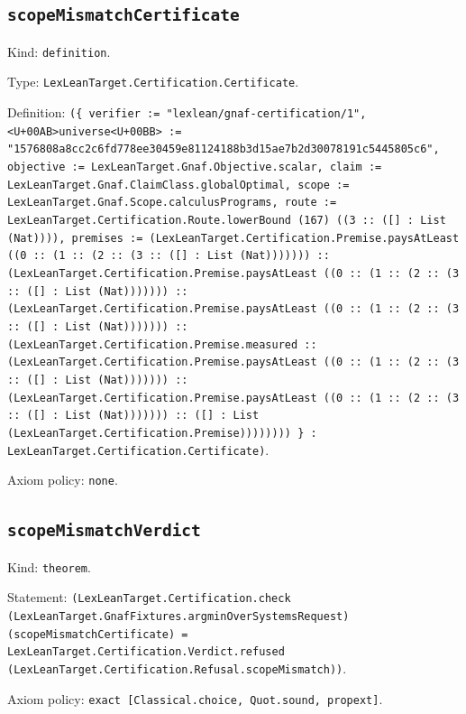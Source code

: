\documentclass[11pt]{article}
\begin{document}
\subsection*{\texttt{scopeMismatchCertificate}}
\noindent Kind: \texttt{definition}.\par
\noindent Type: \texttt{LexLeanTarget.Certification.Certificate}.\par
\noindent Definition: \texttt{(\{ verifier := "lexlean/gnaf-certification/1", <U+00AB>universe<U+00BB> := "1576808a8cc2c6fd778ee30459e81124188b3d15ae7b2d30078191c5445805c6", objective := LexLeanTarget.Gnaf.Objective.scalar, claim := LexLeanTarget.Gnaf.ClaimClass.globalOptimal, scope := LexLeanTarget.Gnaf.Scope.calculusPrograms, route := LexLeanTarget.Certification.Route.lowerBound (167) ((3 :: ([] : List (Nat)))), premises := (LexLeanTarget.Certification.Premise.paysAtLeast ((0 :: (1 :: (2 :: (3 :: ([] : List (Nat))))))) :: (LexLeanTarget.Certification.Premise.paysAtLeast ((0 :: (1 :: (2 :: (3 :: ([] : List (Nat))))))) :: (LexLeanTarget.Certification.Premise.paysAtLeast ((0 :: (1 :: (2 :: (3 :: ([] : List (Nat))))))) :: (LexLeanTarget.Certification.Premise.measured :: (LexLeanTarget.Certification.Premise.paysAtLeast ((0 :: (1 :: (2 :: (3 :: ([] : List (Nat))))))) :: (LexLeanTarget.Certification.Premise.paysAtLeast ((0 :: (1 :: (2 :: (3 :: ([] : List (Nat))))))) :: ([] : List (LexLeanTarget.Certification.Premise)))))))) \} : LexLeanTarget.Certification.Certificate)}.\par
\noindent Axiom policy: \texttt{none}.\par
\subsection*{\texttt{scopeMismatchVerdict}}
\noindent Kind: \texttt{theorem}.\par
\noindent Statement: \texttt{(LexLeanTarget.Certification.check (LexLeanTarget.GnafFixtures.argminOverSystemsRequest) (scopeMismatchCertificate) = LexLeanTarget.Certification.Verdict.refused (LexLeanTarget.Certification.Refusal.scopeMismatch))}.\par
\noindent Axiom policy: \texttt{exact [Classical.choice, Quot.sound, propext]}.\par
\end{document}
